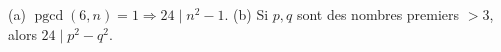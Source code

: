 (a) $\operatorname{pgcd}(6, n) = 1 \Rightarrow 24 \mid n^2 - 1$. (b) Si $p, q$ sont des nombres premiers $> 3$, alors $24 \mid p^2 - q^2$.
